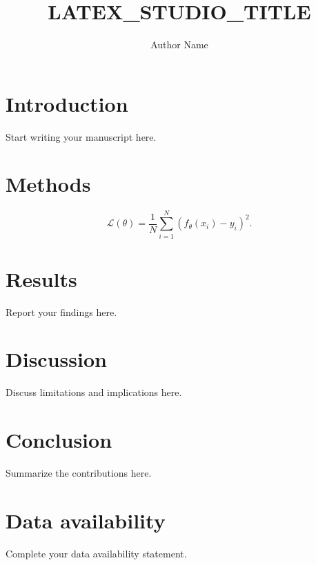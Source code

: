 \documentclass[unnumsec,webpdf,contemporary,large]{oup-authoring-template}
\begin{document}
\title[LATEX_STUDIO_TITLE]{LATEX_STUDIO_TITLE}
\author[1]{Author Name}
\address[1]{,,}
\maketitle

\section{Introduction}
Start writing your manuscript here.

\section{Methods}
\begin{equation}
  \mathcal{L}(\theta) = \frac{1}{N}\sum_{i=1}^{N}(f_\theta(x_i)-y_i)^2.
  \label{eq:objective}
\end{equation}

\section{Results}
Report your findings here.

\section{Discussion}
Discuss limitations and implications here.

\section{Conclusion}
Summarize the contributions here.

\section*{Data availability}
Complete your data availability statement.
% 
% 
\end{document}
